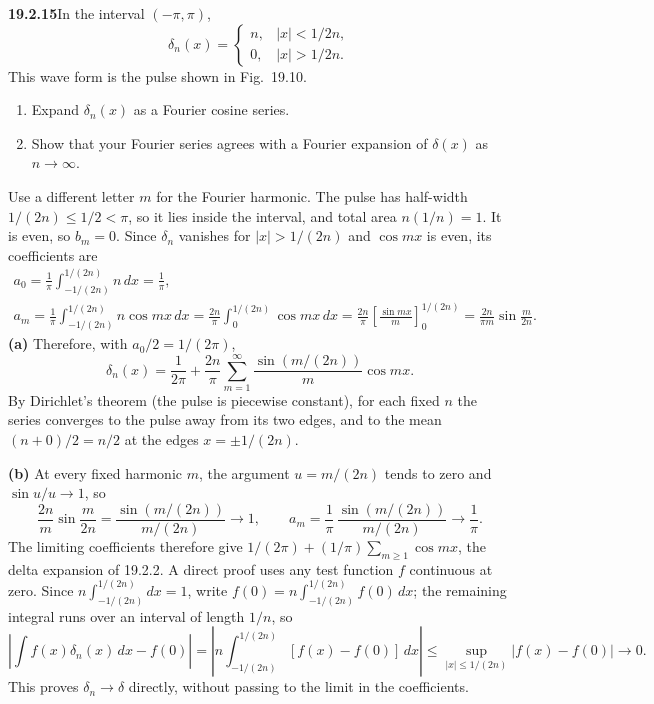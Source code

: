 \par\bigskip
\noindent\textbf{19.2.15}\quad In the interval $(-\pi,\pi)$,
\[
\delta_{n}(x)=\begin{cases}
n, & |x| < 1/2n,\\
0, & |x| > 1/2n.
\end{cases}
\]
This wave form is the pulse shown in Fig.~19.10.
\begin{enumerate}
\item[(a)] Expand $\delta_{n}(x)$ as a Fourier cosine series.
\item[(b)] Show that your Fourier series agrees with a Fourier
expansion of $\delta(x)$  as $n\to\infty$.
\end{enumerate}
\solution
Use a different letter $m$ for the Fourier harmonic. The pulse has
half-width $1/(2n)\le1/2<\pi$, so it lies inside the interval, and total
area $n(1/n)=1$. It is even, so $b_m=0$. Since $\delta_n$ vanishes for
$|x|>1/(2n)$ and $\cos mx$ is even, its coefficients are
\begin{gather*}
a_0=\frac1\pi\int_{-1/(2n)}^{1/(2n)}n\,dx=\frac1\pi,\\
a_m=\frac1\pi\int_{-1/(2n)}^{1/(2n)}n\cos mx\,dx
=\frac{2n}{\pi}\int_0^{1/(2n)}\cos mx\,dx
=\frac{2n}{\pi}\left[\frac{\sin mx}{m}\right]_0^{1/(2n)}
=\frac{2n}{\pi m}\sin\frac{m}{2n}.
\end{gather*}
\textbf{(a)} Therefore, with $a_0/2=1/(2\pi)$,
\[
\boxed{\delta_n(x)=\frac1{2\pi}
+\frac{2n}{\pi}\sum_{m=1}^{\infty}
\frac{\sin(m/(2n))}{m}\cos mx.}
\]
By Dirichlet's theorem (the pulse is piecewise constant), for each fixed
$n$ the series converges to the pulse away from its two edges, and to
the mean $(n+0)/2=n/2$ at the edges $x=\pm1/(2n)$.

\textbf{(b)} At every fixed harmonic $m$, the argument $u=m/(2n)$ tends
to zero and $\sin u/u\to1$, so
\[
\frac{2n}{m}\sin\frac{m}{2n}
=\frac{\sin(m/(2n))}{m/(2n)}\longrightarrow1,
\qquad
a_m=\frac1\pi\,\frac{\sin(m/(2n))}{m/(2n)}\longrightarrow\frac1\pi.
\]
The limiting coefficients therefore give
$1/(2\pi)+(1/\pi)\sum_{m\ge1}\cos mx$, the delta expansion of 19.2.2.
A direct proof uses any test function $f$ continuous at zero. Since
$n\int_{-1/(2n)}^{1/(2n)}dx=1$, write $f(0)=n\int_{-1/(2n)}^{1/(2n)}f(0)\,dx$;
the remaining integral runs over an interval of length $1/n$, so
\[
\left|\int f(x)\delta_n(x)\,dx-f(0)\right|
=\left|n\int_{-1/(2n)}^{1/(2n)}[f(x)-f(0)]\,dx\right|
\le\sup_{|x|\le1/(2n)}|f(x)-f(0)|\longrightarrow0.
\]
This proves $\delta_n\to\delta$ directly, without passing to the limit
in the coefficients.

